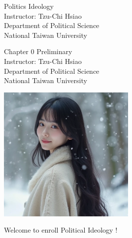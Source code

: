 \documentclass{beamer}
\title{}
\author{}
\date{}
\begin{document}
\begin{frame}
\begin{center}
\Large{Politics Ideology} \\
\vspace{3em}
\normalsize{Instructor: Tzu-Chi Hsiao} \\
\vspace{3em}
\small{Department of Political Science} \\
\vspace{1em}
\small{National Taiwan University}
\end{center}
\end{frame}
\begin{frame}
\begin{center}
\Large{Chapter 0 Preliminary} \\
\vspace{3em}
\normalsize{Instructor: Tzu-Chi Hsiao} \\
\vspace{3em}
\small{Department of Political Science} \\
\vspace{1em}
\small{National Taiwan University} \\
\end{center}
\end{frame}
\begin{frame}{}
\begin{center}
\includegraphics[width=0.5\textwidth]{instructor.png}
\end{center}
\vspace{1em}
\begin{center}
\Large{Welcome to enroll Political Ideology !}
\end{center}
\end{frame}
\end{document}
